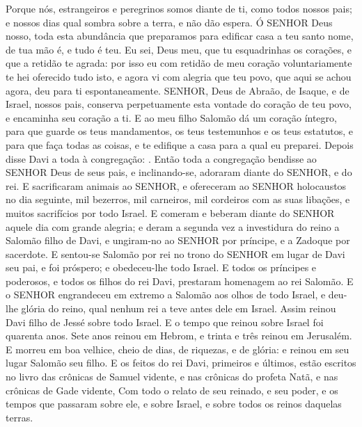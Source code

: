 {{  Porque nós, estrangeiros e peregrinos somos diante de ti, como todos nossos pais; e nossos dias qual sombra sobre a terra, e não dão espera.
  Ó SENHOR Deus nosso, toda esta abundância que preparamos para edificar casa a teu santo nome, de tua mão é, e tudo é teu.
  Eu sei, Deus meu, que tu esquadrinhas os corações, e que a retidão te agrada: por isso eu com retidão de meu coração voluntariamente te hei oferecido tudo isto, e agora vi com alegria que teu povo, que aqui se achou agora, deu para ti espontaneamente. %
  SENHOR, Deus de Abraão, de Isaque, e de Israel, nossos pais, conserva perpetuamente esta vontade do coração de teu povo, e encaminha seu coração a ti.
  E ao meu filho Salomão dá um coração íntegro, para que guarde os teus mandamentos, os teus testemunhos e os teus estatutos, e para que faça todas as coisas, e te edifique a casa para a qual eu preparei}.
  Depois disse Davi a toda à congregação: . Então toda a congregação bendisse ao SENHOR Deus de seus pais, e inclinando-se, adoraram diante do SENHOR, e do rei.
  E sacrificaram animais ao SENHOR, e ofereceram ao SENHOR holocaustos no dia seguinte, mil bezerros, mil carneiros, mil cordeiros com as suas libações, e muitos sacrifícios por todo Israel.
  E comeram e beberam diante do SENHOR aquele dia com grande alegria; e deram a segunda vez a investidura do reino a Salomão filho de Davi, e ungiram-no ao SENHOR por príncipe, e a Zadoque por sacerdote.
  E sentou-se Salomão por rei no trono do SENHOR em lugar de Davi seu pai, e foi próspero; e obedeceu-lhe todo Israel.
  E todos os príncipes e poderosos, e todos os filhos do rei Davi, prestaram homenagem ao rei Salomão.
  E o SENHOR engrandeceu em extremo a Salomão aos olhos de todo Israel, e deu-lhe glória do reino, qual nenhum rei a teve antes dele em Israel. %
  Assim reinou Davi filho de Jessé sobre todo Israel.
  E o tempo que reinou sobre Israel foi quarenta anos. Sete anos reinou em Hebrom, e trinta e três reinou em Jerusalém.
  E morreu em boa velhice, cheio de dias, de riquezas, e de glória: e reinou em seu lugar Salomão seu filho.
  E os feitos do rei Davi, primeiros e últimos, estão escritos no livro das crônicas de Samuel vidente, e nas crônicas do profeta Natã, e nas crônicas de Gade vidente,
  Com todo o relato de seu reinado, e seu poder, e os tempos que passaram sobre ele, e sobre Israel, e sobre todos os reinos daquelas terras.\par } %
